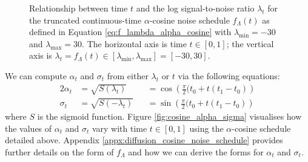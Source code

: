 \documentclass[ oneside,%
                    author={George Herbert},
                    degree={MSci},
                     title={Video Diffusion Models for Climate Simulations},
                  subtitle={}]{dissertation}
\begin{document}
\begin{figure}[htbp]
      \centering
      \caption{Relationship between time $t$ and the log signal-to-noise ratio $\lambda_t$ for the truncated continuous-time $\alpha$-cosine noise schedule $f_\Lambda(t)$ as defined in Equation \ref{eq:f_lambda_alpha_cosine} with $\lambda_{\min}=-30$ and $\lambda_{\max}=30$. The horizontal axis is time $t\in[0,1]$; the vertical axis is $\lambda_t=f_\Lambda(t)\in[\lambda_{\min},\lambda_{\max}]=[-30, 30]$.}
      \label{fig:cosine_lambda_t}
\end{figure}
We can compute $\alpha_t$ and $\sigma_t$ from either $\lambda_t$ or $t$ via the following equations:
\begin{alignat}{2}
      \alpha_t&=\sqrt{S(\lambda_t)}&&=\cos\left(\frac{\pi}{2}(t_0+t(t_1-t_0)\right)\label{eq:alpha_t_alpha_cosine}\\
      \sigma_t&=\sqrt{S(-\lambda_t)}&&=\sin\left(\frac{\pi}{2}(t_0+t(t_1-t_0)\right)\label{eq:sigma_t_alpha_cosine}
\end{alignat}
where $S$ is the sigmoid function. Figure \ref{fig:cosine_alpha_sigma} visualises how the values of $\alpha_t$ and $\sigma_t$ vary with time $t\in[0,1]$ using the $\alpha$-cosine schedule detailed above. Appendix \ref{appx:diffusion_cosine_noise_schedule} provides further details on the form of $f_\Lambda$ and how we can derive the forms for $\alpha_t$ and $\sigma_t$.
\end{document}
